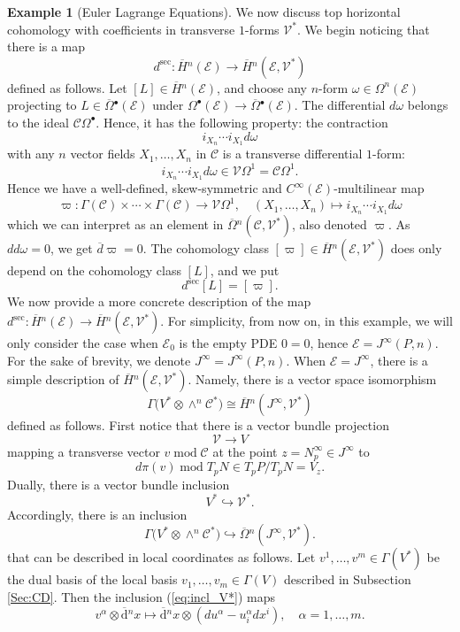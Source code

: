 \documentclass{conm-p-l}
\theoremstyle{definition}
\newtheorem{example}[theorem]{Example}
\theoremstyle{remark}
\numberwithin{equation}{section}
\begin{document}
\begin{example}[Euler Lagrange Equations]\label{exmpl:ELeq}
We now discuss top horizontal cohomology with coefficients in transverse $1$-forms $\mathscr V^\ast$. We begin noticing that there is a map
\[
d^{\mathrm{sec}} : \overline H{}^n (\mathscr E) \to \overline H{}^n (\mathscr E, \mathscr V^\ast)
\]
defined as follows. Let $[L] \in \overline H{}^n (\mathscr E)$, and choose any $n$-form $\omega \in \Omega^n (\mathscr E)$ projecting to $L \in \overline \Omega{}^\bullet (\mathscr E)$ under $\Omega^\bullet (\mathscr E) \to \overline \Omega{}^\bullet (\mathscr E)$. The differential $d \omega$ belongs to the ideal $\mathscr C \Omega^\bullet$. Hence, it has the following property: the contraction
\[
i_{X_n} \cdots i_{X_1} d\omega 
\]
with any $n$ vector fields $X_1, \ldots, X_n$ in $\mathscr C$ is a transverse differential $1$-form: 
\[
i_{X_n} \cdots i_{X_1} d\omega \in \mathscr V \Omega^1 = \mathscr C \Omega^1.
\]
 Hence we have a well-defined, skew-symmetric and $C^\infty (\mathscr E)$-multilinear map
\[
\varpi : \Gamma (\mathscr C) \times \cdots \times \Gamma (\mathscr C) \to \mathscr V \Omega^1, \quad (X_1, \ldots, X_n) \mapsto i_{X_n} \cdots i_{X_1} d\omega 
\]
which we can interpret as an element in $\overline \Omega{}^n (\mathscr C, \mathscr V^\ast)$, also denoted  $\varpi$. As $dd\omega = 0$, we get $\overline d \varpi = 0$. The cohomology class $[\varpi ] \in \overline H{}^n (\mathscr E, \mathscr V^\ast)$ does only depend on the cohomology class $[L]$, and we put
\[
d^{\mathrm{sec}} [L] = [ \varpi]. 
\]
We now provide a more concrete description of the map $d^{\mathrm{sec}} : \overline H{}^n (\mathscr E) \to \overline H{}^n (\mathscr E, \mathscr V^\ast)$. For simplicity, from now on, in this example, we will only consider the case when $\mathscr E_0$ is the empty PDE $0 = 0$, hence $\mathscr E = J^\infty (P, n)$. For the sake of brevity, we denote $J^\infty = J^\infty (P, n)$. When $\mathscr E = J^\infty$, there is a simple description of $\overline H{}^n (\mathscr E, \mathscr V^\ast)$. Namely, there is a vector space isomorphism
\[
\Gamma \big(V^\ast \otimes \wedge^n \mathscr C^\ast \big) \cong \overline H{}^n (J^\infty, \mathscr V^\ast)
\]
defined as follows. First notice that there is a vector bundle projection
\[
\mathscr V \to V
\]
mapping a transverse vector $v \operatorname{mod} \mathscr C$ at the point $z = N_p^\infty \in J^\infty$ to 
\[
d\pi (v) \operatorname{mod} T_p N \in T_p P / T_p N = V_z.
\]
Dually, there is a vector bundle inclusion
\[
V^\ast \hookrightarrow \mathscr V^\ast.
\]
Accordingly, there is an inclusion
\begin{equation}\label{eq:incl_V*}
\Gamma \big(V^\ast \otimes \wedge^n \mathscr C^\ast \big) \hookrightarrow \overline \Omega{}^n (J^\infty, \mathscr V^\ast).
\end{equation}
that can be described in local coordinates as follows. Let $v^1, \ldots, v^m \in \Gamma (V^\ast)$ be the dual basis of the local basis $v_1, \ldots, v_m \in \Gamma (V)$ described in Subsection \ref{Sec:CD}. Then the inclusion (\ref{eq:incl_V*}) maps
\[
v^\alpha \otimes \overline{\mathrm d}{}^n x \mapsto \overline{\mathrm d}{}^n x \otimes (du^\alpha - u^\alpha_i dx^i), \quad \alpha = 1, \ldots, m.
\]


\end{example}
\end{document}
